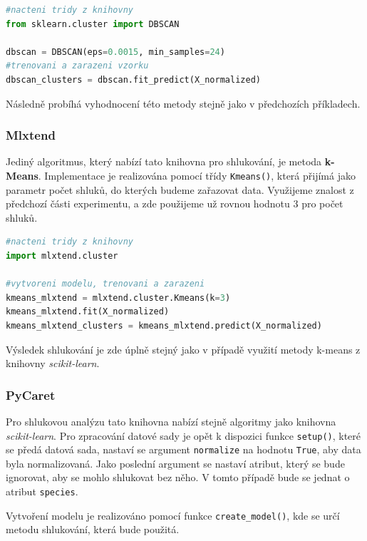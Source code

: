\begin{mdframed}
\begin{lstlisting}[language=Python]
#nacteni tridy z knihovny
from sklearn.cluster import DBSCAN

dbscan = DBSCAN(eps=0.0015, min_samples=24)
#trenovani a zarazeni vzorku
dbscan_clusters = dbscan.fit_predict(X_normalized)
\end{lstlisting}   
\end{mdframed}
Následně probíhá vyhodnocení této metody stejně jako v předchozích příkladech.

\subsubsection*{Mlxtend}
Jediný algoritmus, který nabízí tato knihovna pro shlukování, je metoda \textbf{k-Means}. Implementace je realizována pomocí třídy \verb|Kmeans()|, která přijímá jako parametr počet shluků, do kterých budeme zařazovat data. Využijeme znalost z předchozí části experimentu, a zde použijeme už rovnou hodnotu 3 pro počet shluků. 

\begin{mdframed}
\begin{lstlisting}[language=Python]
#nacteni tridy z knihovny
import mlxtend.cluster

#vytvoreni modelu, trenovani a zarazeni
kmeans_mlxtend = mlxtend.cluster.Kmeans(k=3)
kmeans_mlxtend.fit(X_normalized)
kmeans_mlxtend_clusters = kmeans_mlxtend.predict(X_normalized)
\end{lstlisting}   
\end{mdframed}

Výsledek shlukování je zde úplně stejný jako v případě využití metody k-means z knihovny \textit{scikit-learn}.

\subsubsection*{PyCaret}
Pro shlukovou analýzu tato knihovna nabízí stejně algoritmy jako knihovna \textit{scikit-learn}. Pro zpracování datové sady je opět k dispozici funkce \verb|setup()|, které se předá datová sada, nastaví se argument \verb|normalize| na hodnotu \verb|True|, aby data byla normalizovaná. Jako poslední argument se nastaví
atribut, který se bude ignorovat, aby se mohlo shlukovat bez něho. V tomto případě
bude se jednat o atribut \verb|species|. 

Vytvoření modelu je realizováno pomocí funkce \verb|create_model()|, kde se určí metodu shlukování, která bude použitá. 

